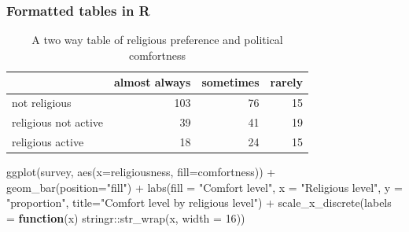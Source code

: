 \documentclass[
]{book}
\newenvironment{Shaded}{\begin{snugshade}}{\end{snugshade}}
\newcommand{\AttributeTok}[1]{\textcolor[rgb]{0.77,0.63,0.00}{#1}}
\newcommand{\ControlFlowTok}[1]{\textcolor[rgb]{0.13,0.29,0.53}{\textbf{#1}}}
\newcommand{\DecValTok}[1]{\textcolor[rgb]{0.00,0.00,0.81}{#1}}
\newcommand{\FunctionTok}[1]{\textcolor[rgb]{0.00,0.00,0.00}{#1}}
\newcommand{\NormalTok}[1]{#1}
\newcommand{\SpecialCharTok}[1]{\textcolor[rgb]{0.00,0.00,0.00}{#1}}
\newcommand{\StringTok}[1]{\textcolor[rgb]{0.31,0.60,0.02}{#1}}
\begin{document}
\hypertarget{formatted-tables-in-r}{%
\subsubsection{Formatted tables in R}\label{formatted-tables-in-r}}

\begin{Shaded}
\end{Shaded}

\begin{table}

\caption{\label{tab:unnamed-chunk-3}A two way table of religious preference and political comfortness}
\centering
\begin{tabular}[t]{l|r|r|r}
\hline
  & almost always & sometimes & rarely\\
\hline
not religious & 103 & 76 & 15\\
\hline
religious not active & 39 & 41 & 19\\
\hline
religious active & 18 & 24 & 15\\
\hline
\end{tabular}
\end{table}

\begin{Shaded}
\begin{Highlighting}[]
\FunctionTok{ggplot}\NormalTok{(survey, }\FunctionTok{aes}\NormalTok{(}\AttributeTok{x=}\NormalTok{religiousness, }\AttributeTok{fill=}\NormalTok{comfortness)) }\SpecialCharTok{+}
  \FunctionTok{geom\_bar}\NormalTok{(}\AttributeTok{position=}\StringTok{"fill"}\NormalTok{) }\SpecialCharTok{+}
  \FunctionTok{labs}\NormalTok{(}\AttributeTok{fill =} \StringTok{"Comfort level"}\NormalTok{, }\AttributeTok{x =} \StringTok{"Religious level"}\NormalTok{, }\AttributeTok{y =} \StringTok{"proportion"}\NormalTok{, }
       \AttributeTok{title=}\StringTok{"Comfort level by religious level"}\NormalTok{) }\SpecialCharTok{+}
    \FunctionTok{scale\_x\_discrete}\NormalTok{(}\AttributeTok{labels =} \ControlFlowTok{function}\NormalTok{(x) stringr}\SpecialCharTok{::}\FunctionTok{str\_wrap}\NormalTok{(x, }\AttributeTok{width =} \DecValTok{16}\NormalTok{))}
\end{Highlighting}
\end{Shaded}
\end{document}
